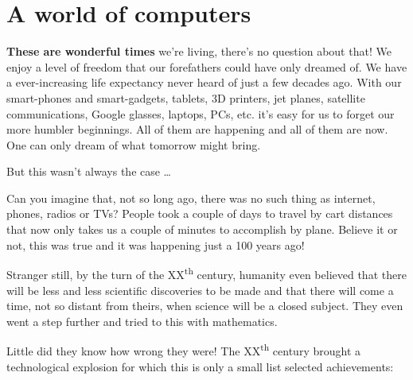 \documentclass[12pt, a4paper]{book}
\begin{document}
\chapter{A world of computers}

\textbf{These are wonderful times} we're living, there's no question about that! We enjoy a level of freedom that our forefathers could have only dreamed of. We have a ever-increasing life expectancy never heard of just a few decades ago. With our smart-phones and smart-gadgets, tablets, 3D printers, jet planes, satellite communications, Google glasses, laptops, PCs, etc. it's easy for us to forget our more humbler beginnings. All of them are happening and all of them are now. One can only dream of what tomorrow might bring. 

But this wasn't always the case \ldots 

Can you imagine that, not so long ago, there was no such thing as internet, phones, radios or TVs? People took a couple of days to travel by cart distances that now only takes us a couple of minutes to accomplish by plane. Believe it or not, this was true and it was happening just a 100 years ago!

Stranger still, by the turn of the \textsc{XX}\textsuperscript{th} century, humanity even believed that there will be less and less scientific discoveries to be made and that there will come a time, not so distant from theirs, when science will be a closed subject. They even went a step further and tried to this with mathematics. 

Little did they know how wrong they were! The \textsc{XX}\textsuperscript{th} century brought a technological explosion for which this is only a small list selected achievements:
\end{document}
